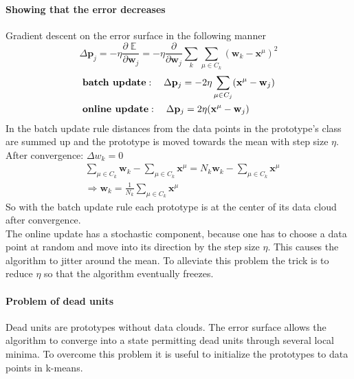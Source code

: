 \documentclass[11pt]{article}
\DeclareMathOperator{\E}{\mathbb{E}}
\begin{document}
\paragraph{Showing that the error decreases}
Gradient descent on the error surface in the following manner 
\[
\Delta \mathbf{p}_j = -\eta \frac{\partial\E}{\partial\mathbf{w}_j} = -\eta \frac{\partial}{\partial\mathbf{w}_j} \sum_k \sum_{\mu \in C_k} (\mathbf{w}_k-\mathbf{x}^\mu)^2
\]
\begin{align*}
&\text{\textbf{batch update}}: \quad\Delta \mathbf{p}_j
= -2\eta \sum_{\mu \in C_j}(\mathbf{x^\mu}-\mathbf{w}_j)\\
&\text{\textbf{online update}}: \quad\Delta \mathbf{p}_j
= 2\eta (\mathbf{x^\mu}-\mathbf{w}_j)
\end{align*}
In the batch update rule distances from the data points in the prototype's class are summed up and the prototype is moved towards the mean with step size $\eta$.\\
After convergence: $\Delta w_k=0$
\begin{align*}
&\sum_{\mu \in C_k}\mathbf{w}_k-\sum_{\mu \in C_k}\mathbf{x}^\mu=N_k\mathbf{w}_k-\sum_{\mu \in C_k}\mathbf{x}^\mu\\
&\Rightarrow \mathbf{w}_k=\frac{1}{N_k}\sum_{\mu \in C_k}\mathbf{x}^\mu
\end{align*}
So with the batch update rule each prototype is at the center of its data cloud after convergence.\\
The online update has a stochastic component, because one has to choose a data point at random and move into its direction by the step size $\eta$. This causes the algorithm to jitter around the mean. To alleviate this problem the trick is to reduce $\eta$ so that the algorithm eventually freezes.
\paragraph{Problem of dead units}
Dead units are prototypes without data clouds. The error surface allows the algorithm to converge into a state permitting dead units through several local minima. To overcome this problem it is useful to initialize the prototypes to data points in k-means.
\end{document}
